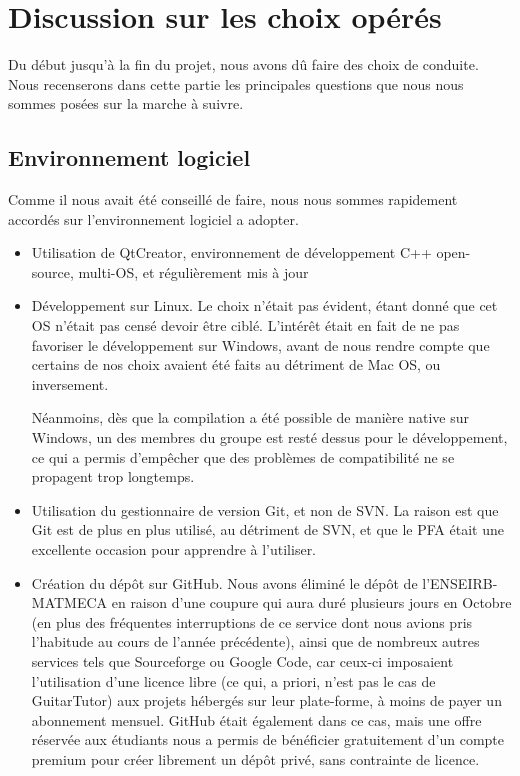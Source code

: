 \section{Discussion sur les choix opérés}

Du début jusqu'à la fin du projet, nous avons dû faire des choix de conduite. Nous recenserons dans cette partie les principales questions que nous nous sommes posées sur la marche à suivre.

\subsection{Environnement logiciel}

Comme il nous avait été conseillé de faire, nous nous sommes rapidement accordés sur l'environnement logiciel a adopter.
\begin{itemize}
 \item Utilisation de QtCreator, environnement de développement C++ open-source, multi-OS, et régulièrement mis à jour
 \item Développement sur Linux. Le choix n'était pas évident, étant donné que cet OS n'était pas censé devoir être ciblé. L'intérêt était en fait de ne pas favoriser le développement sur Windows, avant de nous rendre compte que certains de nos choix avaient été faits au détriment de Mac OS, ou inversement.

 Néanmoins, dès que la compilation a été possible de manière native sur Windows, un des membres du groupe est resté dessus
 pour le développement, ce qui a permis d'empêcher que des problèmes de compatibilité ne se propagent trop longtemps.
 \item Utilisation du gestionnaire de version Git, et non de SVN. La raison est que Git est de plus en plus utilisé, au détriment de SVN, et que le PFA était une excellente occasion pour apprendre à l'utiliser.
 \item Création du dépôt sur GitHub. Nous avons éliminé le dépôt de l'ENSEIRB-MATMECA en raison d'une coupure qui aura duré plusieurs jours en Octobre (en plus des fréquentes interruptions de ce service dont nous avions pris l'habitude au cours de l'année précédente), ainsi que de nombreux autres services tels que Sourceforge ou Google Code, car ceux-ci imposaient l'utilisation d'une licence libre (ce qui, a priori, n'est pas le cas de GuitarTutor) aux projets hébergés sur leur plate-forme, à moins de payer un abonnement mensuel. GitHub était également dans ce cas, mais une offre réservée aux étudiants nous a permis de bénéficier gratuitement d'un compte premium pour créer librement un dépôt privé, sans contrainte de licence.
\end{itemize}

